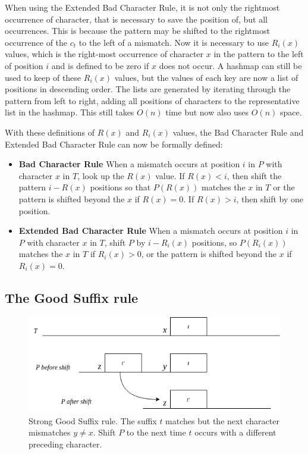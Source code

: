 
When using the Extended Bad Character Rule, it is not only the rightmost occurrence of character, that is necessary to save the position of, but all occurrences. This is because the pattern may be shifted to the rightmost occurrence of the $c_t$ to the left of a mismatch. Now it is necessary to use $R_i(x)$ values, which is the right-most occurrence of character $x$ in the pattern to the left of position $i$ and is defined to be zero if $x$ does not occur. A hashmap can still be used to keep of these $R_i(x)$ values, but the values of each key are now a list of positions in descending order. The lists are generated by iterating through the pattern from left to right, adding all positions of characters to the representative list in the hashmap. This still takes $O(n)$ time but now also uses $O(n)$ space.


With these definitions of $R(x)$ and $R_i(x)$ values, the Bad Character Rule and Extended Bad Character Rule can now be formally defined:

\begin{itemize}
    \item[] \textbf{Bad Character Rule} When a mismatch occurs at position $i$ in $P$ with character $x$ in $T$, look up the $R(x)$ value. If $R(x)<i$, then shift the pattern $i-R(x)$ positions so that $P(R(x))$ matches the $x$ in $T$ or the pattern is shifted beyond the $x$ if $R(x)=0$. If $R(x)>i$, then shift by one position. 
    \item[] \textbf{Extended Bad Character Rule} When a mismatch occurs at position $i$ in $P$ with character $x$ in $T$, shift $P$ by $i-R_i(x)$ positions, so $P(R_i(x))$ matches the $x$ in $T$ if $R_i(x)>0$, or the pattern is shifted beyond the $x$ if $R_i(x)=0$. 
\end{itemize}

\subsection{The Good Suffix rule}

\begin{figure}[t]
    \centering
    \includegraphics[width=\textwidth]{LaTeX/Figures/Zalg/suffixrule.png}
    \caption{Strong Good Suffix rule. The suffix $t$ matches but the next character mismatches $y\neq x$. Shift $P$ to the next time $t$ occurs with a different preceding character. }
    \label{fig:suffixrule}
\end{figure}

